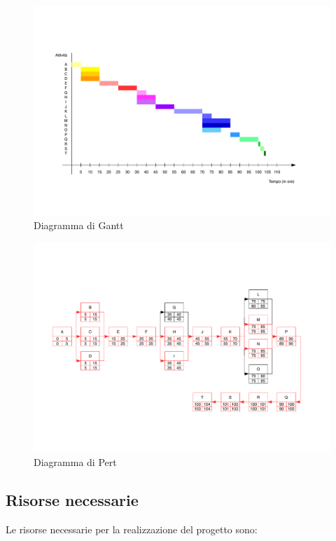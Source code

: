 \documentclass{article}
\begin{document}
\begin{figure}[htbp]
\centering
\includegraphics[trim={0 4cm 0 4cm},clip,width=16cm]{Gantt.pdf}
\caption{Diagramma di Gantt}
\end{figure}

\begin{figure}[htbp]
\centering
\includegraphics[trim={0 4cm 0 4cm},clip,width=16cm]{PERT.pdf}
\caption{Diagramma di Pert}
\end{figure}


\subsection{Risorse necessarie}

Le risorse necessarie per la realizzazione del progetto sono:
\end{document}
